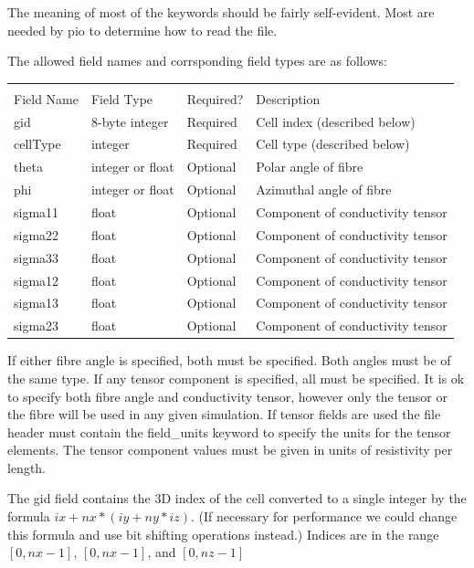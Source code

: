 \documentclass{article}
\begin{document}
The meaning of most of the keywords should be fairly self-evident.
  Most are needed by pio to determine
how to read the file.  


\bigskip
The allowed field names and corrsponding field types are as follows:

\begin{tabular}{l|l|l|p{}}
  & & & \\
  Field Name & Field Type & Required? & Description\\
  \hline
  gid &      8-byte integer   & Required & Cell index (described below)\\
  cellType & integer          & Required & Cell type (described below)\\
  theta &    integer or float & Optional & Polar angle of fibre\\
  phi &      integer or float & Optional & Azimuthal angle of fibre\\
  sigma11 &  float            & Optional & Component of conductivity tensor\\
  sigma22 &  float            & Optional & Component of conductivity tensor\\
  sigma33 &  float            & Optional & Component of conductivity tensor\\
  sigma12 &  float            & Optional & Component of conductivity tensor\\
  sigma13 &  float            & Optional & Component of conductivity tensor\\
  sigma23 &  float            & Optional & Component of conductivity tensor\\
\end{tabular}

\bigskip
If either fibre angle is specified, both must be specified.  Both angles
must be of the same type.  If any tensor component is specified, all
must be specified.  It is ok to specify both fibre angle and
conductivity tensor, however only the tensor or the fibre will be used
in any given simulation.  If tensor fields are used the file header must
contain the field\_units keyword to specify the units for the tensor
elements.  The tensor component values must be given in units of
resistivity per length.

The gid field contains the 3D index of the cell converted to a single
integer by the formula $ix + nx*(iy + ny*iz)$.  (If necessary for
performance we could change this formula and use bit shifting operations
instead.)  Indices are in the range $[0, nx-1]$, $[0, nx-1]$, and $[0, nz-1]$ 
\end{document}
